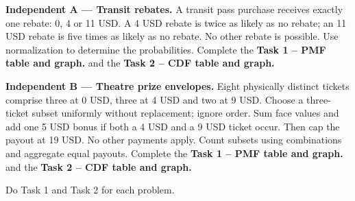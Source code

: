 \medskip
\noindent\begin{minipage}[t]{.48\linewidth}
\vspace{0pt}
\textbf{Independent A --- Transit rebates.}
A transit pass purchase receives exactly one rebate: 0, 4 or 11 USD.
A 4 USD rebate is twice as likely as no rebate; an 11 USD rebate is
five times as likely as no rebate. No other rebate is possible.
Use normalization to determine the probabilities. Complete the \textbf{Task 1 -- PMF table and graph.} and the \textbf{Task 2 -- CDF table and graph.}
\end{minipage}\hfill
\begin{minipage}[t]{.48\linewidth}
\vspace{0pt}
\textbf{Independent B --- Theatre prize envelopes.}
Eight physically distinct tickets comprise three at 0 USD, three at 4 USD
and two at 9 USD. Choose a three-ticket subset uniformly without replacement;
ignore order. Sum face values and add one 5 USD bonus if both a 4 USD and
a 9 USD ticket occur. Then cap the payout at 19 USD. No other payments apply.
Count subsets using combinations and aggregate equal payouts. Complete the \textbf{Task 1 -- PMF table and graph.} and the \textbf{Task 2 -- CDF table and graph.}
\end{minipage}\par
Do Task 1 and Task 2 for each problem.
\endgroup


